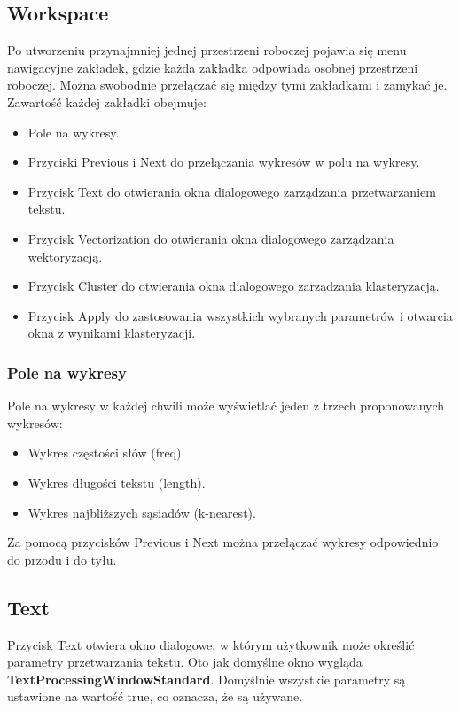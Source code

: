 	\subsection{Workspace}
		Po utworzeniu przynajmniej jednej przestrzeni roboczej pojawia się menu nawigacyjne zakładek, gdzie każda zakładka odpowiada osobnej przestrzeni roboczej. Można swobodnie przełączać się między tymi zakładkami i zamykać je. Zawartość każdej zakładki obejmuje:
		\begin{itemize}
			\item Pole na wykresy.
			\item Przyciski Previous i Next do przełączania wykresów w polu na wykresy.
			\item Przycisk Text do otwierania okna dialogowego zarządzania przetwarzaniem tekstu.
			\item Przycisk Vectorization do otwierania okna dialogowego zarządzania wektoryzacją.
			\item Przycisk Cluster do otwierania okna dialogowego zarządzania klasteryzacją.
			\item Przycisk Apply do zastosowania wszystkich wybranych parametrów i otwarcia okna z wynikami klasteryzacji.
		\end{itemize}
		
	\subsubsection{Pole na wykresy}
			Pole na wykresy w każdej chwili może wyświetlać jeden z trzech proponowanych wykresów:
			\begin{itemize}
				\item Wykres częstości słów (freq). 
				\item Wykres długości tekstu (length).
				\item Wykres najbliższych sąsiadów (k-nearest). 
			\end{itemize}					
			
			Za pomocą przycisków Previous i Next można przełączać wykresy odpowiednio do przodu i do tyłu.		
					
		
	\subsection{Text}
			Przycisk Text otwiera okno dialogowe, w którym użytkownik może określić parametry przetwarzania tekstu. Oto jak domyślne okno wygląda \textbf{TextProcessingWindowStandard}. Domyślnie wszystkie parametry są ustawione na wartość true, co oznacza, że są używane.

